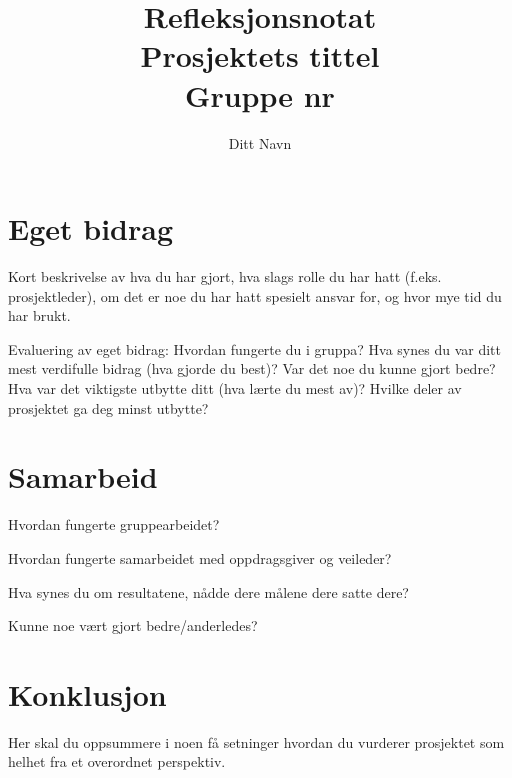 \documentclass[11pt,a4paper]{report}
\begin{document}
\title{
Refleksjonsnotat \\
\vspace{2cm}
Prosjektets tittel\\
Gruppe nr
}
\author{
\LARGE 
Ditt Navn}
\maketitle

\section*{Eget bidrag}

Kort beskrivelse av hva du har gjort, hva slags rolle du har hatt (f.eks. prosjektleder), om det er noe du har hatt spesielt ansvar for, og hvor mye tid du har  brukt.

Evaluering av eget bidrag: Hvordan fungerte du i gruppa? Hva synes du var ditt mest verdifulle bidrag (hva gjorde du best)? Var det noe du kunne gjort bedre? Hva var det viktigste utbytte ditt (hva lærte du mest av)? Hvilke deler av prosjektet ga deg minst utbytte? 

\lipsum[1-2]

\section*{Samarbeid}

Hvordan fungerte gruppearbeidet?

Hvordan fungerte samarbeidet med oppdragsgiver og veileder?
    
Hva synes du om resultatene, nådde dere målene dere satte dere?

Kunne noe vært gjort bedre/anderledes? 
    
\lipsum[3-4]

\section*{Konklusjon}

Her skal du oppsummere i noen få setninger hvordan du vurderer prosjektet som helhet fra et overordnet perspektiv.

\lipsum[5]
\end{document}

